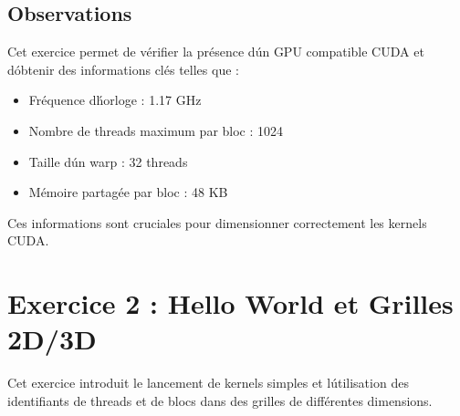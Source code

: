 \documentclass[a4paper,11pt]{article}
\begin{document}
\subsection{Observations}
Cet exercice permet de vérifier la présence d\'un GPU compatible CUDA et d\'obtenir des informations clés telles que :
\begin{itemize}
    \item Fréquence d\'horloge : 1.17 GHz
    \item Nombre de threads maximum par bloc : 1024
    \item Taille d\'un warp : 32 threads
    \item Mémoire partagée par bloc : 48 KB
\end{itemize}
Ces informations sont cruciales pour dimensionner correctement les kernels CUDA.

\section{Exercice 2 : Hello World et Grilles 2D/3D}
Cet exercice introduit le lancement de kernels simples et l\'utilisation des identifiants de threads et de blocs dans des grilles de différentes dimensions.
\end{document}
